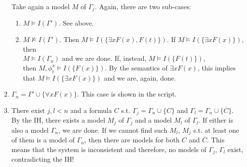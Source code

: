 \begin{enumerate}
	Take again a model $M$ of $\Gamma_j$. Again, there are two sub-cases:
	
	\begin{enumerate}
		\item $M \models I(\Gamma')$. See above.
		\item $M \not\models I(\Gamma')$. Then $M \models I(\{\exists x F(x), F(t)\})$. If $M \models I(\{\exists x F(x)\})$, then\\ $M \models I(\Gamma_n)$ and we are done. If, instead, $M \models I(\{ F(t) \})$,\\ then $M, \phi^x_t \models I(\{F(x)\})$. By the semantics of $\exists x F(x)$, this implies that $M \models I(\{\exists x F(x)\})$ and we are, again, done.
	\end{enumerate}
	
	\item $\Gamma_n = \Gamma' \cup \{\forall x F(x)\}$. This case is shown in the script.
	
	\item There exist $j,l < n$ and a formula $C$ s.t. $\Gamma_j = \Gamma_n \cup \{C\}$ and $\Gamma_l = \Gamma_n \cup \{\overline{C}\}$. By the IH, there exists a model $M_j$ of $\Gamma_j$ and a model $M_l$ of $\Gamma_l$. If either is also a model $\Gamma_n$, we are done. If we cannot find such $M_l$, $M_j$ s.t. at least one of them is a model of $\Gamma_n$, then there are models for both $C$ and $\overline{C}$. This means that the system is inconsistent and therefore, no models of $\Gamma_j$, $\Gamma_l$ exist, contradicting the IH!
\end{enumerate}

\setcounter{section}{8}

